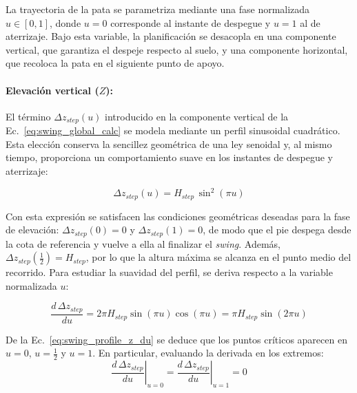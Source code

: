 La trayectoria de la pata se parametriza mediante una fase normalizada $u\in[0,1]$, donde $u=0$ corresponde al instante de despegue y $u=1$ al de aterrizaje. Bajo esta variable, la planificación se desacopla en una componente vertical, que garantiza el despeje respecto al suelo, y una componente horizontal, que recoloca la pata en el siguiente punto de apoyo.

\vspace{-0.5\baselineskip}
\paragraph{Elevación vertical ($Z$):}
El término $\Delta z_{step}(u)$ introducido en la componente vertical de la Ec.~\ref{eq:swing_global_calc} se modela mediante un perfil sinusoidal cuadrático. Esta elección conserva la sencillez geométrica de una ley senoidal y, al mismo tiempo, proporciona un comportamiento suave en los instantes de despegue y aterrizaje:

\vspace{-1\baselineskip}
\begin{equation}
    \Delta z_{step}(u) = H_{step}\,\sin^2(\pi u)
    \label{eq:swing_profile_z}
\end{equation}
\vspace{-1.5\baselineskip}

Con esta expresión se satisfacen las condiciones geométricas deseadas para la fase de elevación: $\Delta z_{step}(0)=0$ y $\Delta z_{step}(1)=0$, de modo que el pie despega desde la cota de referencia y vuelve a ella al finalizar el \textit{swing}. Además, $\Delta z_{step}\!\left(\frac{1}{2}\right)=H_{step}$, por lo que la altura máxima se alcanza en el punto medio del recorrido. Para estudiar la suavidad del perfil, se deriva respecto a la variable normalizada $u$:

\vspace{-0.5\baselineskip}
\begin{equation}
    \frac{d\,\Delta z_{step}}{du}
    =
    2\pi H_{step}\sin(\pi u)\cos(\pi u)
    =
    \pi H_{step}\sin(2\pi u)
    \label{eq:swing_profile_z_du}
\end{equation}
\vspace{-1\baselineskip}

De la Ec.~\ref{eq:swing_profile_z_du} se deduce que los puntos críticos aparecen en $u=0$, $u=\frac{1}{2}$ y $u=1$. En particular, evaluando la derivada en los extremos:
\begin{equation}
    \left.\frac{d\,\Delta z_{step}}{du}\right|_{u=0}
    =
    \left.\frac{d\,\Delta z_{step}}{du}\right|_{u=1}
    =0
    \label{eq:swing_profile_z_zero_slope}
\end{equation}
\vspace{-1\baselineskip}


